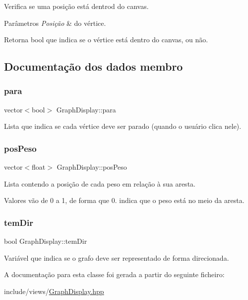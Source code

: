 Verifica se uma posição está dentrod do canvas. 
\begin{DoxyParams}{Parâmetros}
{\em Posição} & do vértice. \\
\hline
\end{DoxyParams}
\begin{DoxyReturn}{Retorna}
bool que indica se o vértice está dentro do canvas, ou não. 
\end{DoxyReturn}


\subsection{Documentação dos dados membro}
\mbox{\label{classGraphDisplay_aa9c12d024cc689f6be699e2028e60d83}} 
\subsubsection{\texorpdfstring{para}{para}}
{\footnotesize\ttfamily vector$<$bool$>$ Graph\+Display\+::para}

Lista que indica se cada vértice deve ser parado (quando o usuário clica nele). \mbox{\label{classGraphDisplay_a5e623e031f43e01713d991c29848cd96}} 
\subsubsection{\texorpdfstring{posPeso}{posPeso}}
{\footnotesize\ttfamily vector$<$float$>$ Graph\+Display\+::pos\+Peso}

Lista contendo a posição de cada peso em relação à sua aresta.

Valores vão de 0 a 1, de forma que 0. indica que o peso está no meio da aresta. \mbox{\label{classGraphDisplay_a9d9f390d193fda9a5503b7629fd50bf3}} 
\subsubsection{\texorpdfstring{temDir}{temDir}}
{\footnotesize\ttfamily bool Graph\+Display\+::tem\+Dir}

Variável que indica se o grafo deve ser representado de forma direcionada. 

A documentação para esta classe foi gerada a partir do seguinte ficheiro\+:\begin{DoxyCompactItemize}
\item 
include/views/\mbox{\hyperlink{GraphDisplay_8hpp}{Graph\+Display.\+hpp}}\end{DoxyCompactItemize}
